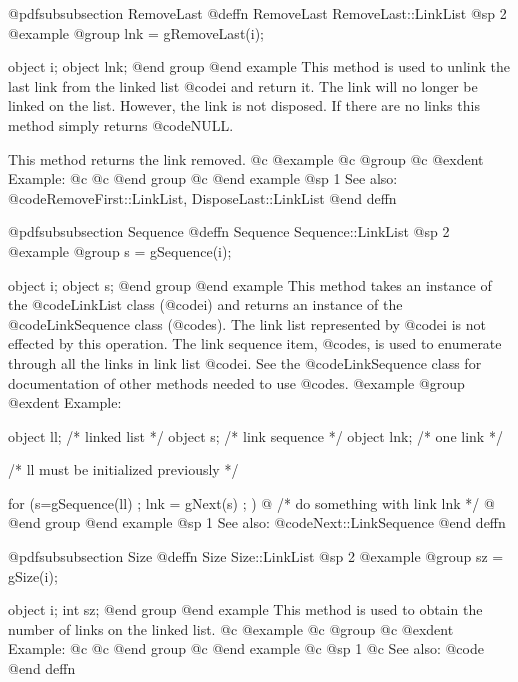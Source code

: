 @pdfsubsubsection {RemoveLast}
@deffn {RemoveLast} RemoveLast::LinkList
@sp 2
@example
@group
lnk = gRemoveLast(i);

object  i;
object  lnk;
@end group
@end example
This method is used to unlink the last link from the linked list
@code{i} and return it.  The link will no longer be linked on the list.
However, the link is not disposed.  If there are no links this method
simply returns @code{NULL}.

This method returns the link removed.
@c @example
@c @group
@c @exdent Example:
@c 
@c @end group
@c @end example
@sp 1
See also:  @code{RemoveFirst::LinkList, DisposeLast::LinkList}
@end deffn










@pdfsubsubsection {Sequence}
@deffn {Sequence} Sequence::LinkList
@sp 2
@example
@group
s = gSequence(i);

object  i;
object  s;
@end group
@end example
This method takes an instance of the @code{LinkList} class (@code{i})
and returns an instance of the @code{LinkSequence} class (@code{s}).
The link list represented by @code{i} is not effected by this operation.
The link sequence item, @code{s}, is used to enumerate through all the
links in link list @code{i}.  See the @code{LinkSequence} class for
documentation of other methods needed to use @code{s}.
@example
@group
@exdent Example:

object  ll;  /*  linked list    */
object  s;   /*  link sequence  */
object  lnk; /*  one link       */

/*  ll must be initialized previously  */

for (s=gSequence(ll) ; lnk = gNext(s) ; )  @{
        /*  do something with link lnk  */
@}
@end group
@end example
@sp 1
See also:  @code{Next::LinkSequence}
@end deffn

















@pdfsubsubsection {Size}
@deffn {Size} Size::LinkList
@sp 2
@example
@group
sz = gSize(i);

object  i;
int     sz;
@end group
@end example
This method is used to obtain the number of links on the linked list.
@c @example
@c @group
@c @exdent Example:
@c 
@c @end group
@c @end example
@c @sp 1
@c See also:  @code{}
@end deffn












